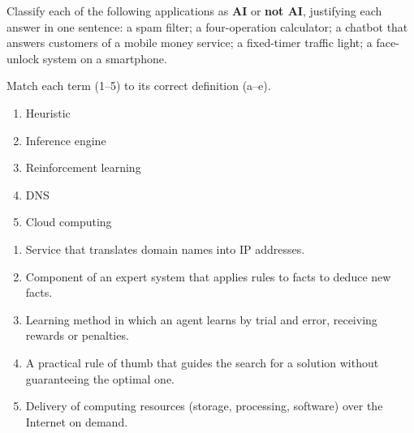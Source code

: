 \documentclass[11pt]{article}
\newcounter{popsec}
\newcounter{popsub}
\newcommand{\courssub}[1]{%
  \stepcounter{popsub}%
  \par\vspace{9pt}\noindent{\popxbold\fontsize{11.5}{13}\selectfont\color{popink}{\color{poporange}\thepopsec.\thepopsub}\hspace{6pt}#1}\par\nopagebreak\vspace{4pt}
}
\begin{document}
\courssub{I practise}

\begin{exercice}[AI or not AI?]
Classify each of the following applications as \textbf{AI} or \textbf{not AI}, justifying each answer in one sentence: a spam filter; a four-operation calculator; a chatbot that answers customers of a mobile money service; a fixed-timer traffic light; a face-unlock system on a smartphone.
\end{exercice}

\begin{exercice}
Match each term (1--5) to its correct definition (a--e).
\begin{enumerate}
\item Heuristic \item Inference engine \item Reinforcement learning \item DNS \item Cloud computing
\end{enumerate}
\begin{enumerate}[label=\alph*)]
\item Service that translates domain names into IP addresses.
\item Component of an expert system that applies rules to facts to deduce new facts.
\item Learning method in which an agent learns by trial and error, receiving rewards or penalties.
\item A practical rule of thumb that guides the search for a solution without guaranteeing the optimal one.
\item Delivery of computing resources (storage, processing, software) over the Internet on demand.
\end{enumerate}
\end{exercice}
\end{document}
